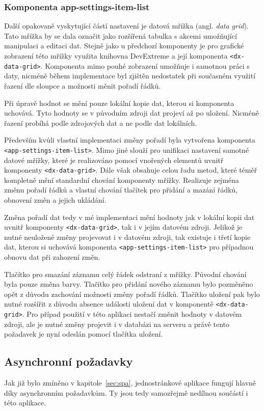 \subsubsection*{Komponenta app-settings-item-list}
Další opakovaně vyskytující částí nastavení je datová mřížka (angl. \emph{data grid}). Tato mřížka by se dala označit jako rozšířená tabulka s akcemi umožňující manipulaci a editaci dat. Stejně jako u předchozí komponenty je pro grafické zobrazení této mřížky využita knihovna DevExtreme a její komponenta \texttt{<dx-data-grid>}. Komponenta mimo pouhé zobrazení umožňuje i samotnou práci s daty, nicméně během implementace byl zjištěn nedostatek při současném využití řazení dle sloupce a možnosti měnit pořadí řádků.

Při úpravě hodnot se mění pouze lokální kopie dat, kterou si komponenta uchovává. Tyto hodnoty se v původním zdroji dat projeví až po uložení. Nicméně řazení probíhá podle zdrojových dat a ne podle dat lokálních.

Především kvůli vlastní implementaci změny pořadí byla vytvořena komponenta \texttt{<app-settings-item-list>}. Mimo jiné slouží pro unifikaci nastavení samotné datové mřížky, které je realizováno pomocí vnořených elementů uvnitř komponenty \texttt{<dx-data-grid>}. Dále však obsahuje celou řadu metod, které téměř kompletně mění standardní chování komponenty mřížky. Realizuje zejména změnu pořadí řádků a vlastní chování tlačítek pro přidání a mazání řádků, obnovení změn a jejich ukládání.

Změna pořadí dat tedy v mé implementaci mění hodnoty jak v lokální kopii dat uvnitř komponenty \texttt{<dx-data-grid>}, tak i v jejím datovém zdroji. Jelikož je nutné neuložené změny projevovat i v datovém zdroji, tak existuje i třetí kopie dat, kterou si uchovává komponenta \texttt{<app-settings-item-list>} pro případnou obnovu dat při zahození změn.

Tlačítko pro smazání záznamu celý řádek odstraní z mřížky. Původní chování byla pouze změna barvy. Tlačítko pro přidání nového záznamu bylo pozměněno opět z důvodu zachování možnosti změny pořadí řádků. Tlačítko uložení pak bylo nutné rozšířit z důvodu absence události uložení dat v komponentě \texttt{<dx-data-grid>}. Pro případ použití v této aplikaci nestačí změnit hodnoty v datovém zdroji, ale je nutné změny projevit i v databázi na serveru a právě tento požadavek je nyní odeslán pomocí tlačítka uložení. 


\subsection{Asynchronní požadavky}
Jak již bylo zmíněno v kapitole~\ref{sec:spa}, jednostránkové aplikace fungují hlavně díky asynchronním požadavkům. Ty jsou tedy samozřejmě nedílnou součástí i této aplikace.

